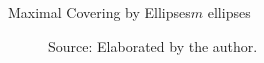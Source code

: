 \documentclass{beamer}
\newcommand{\source}[1]{\caption*{Source: {#1}} }
\begin{document}
\begin{frame}{Maximal Covering by Ellipses}{$m$ ellipses}
\begin{figure}
	
	\source{Elaborated by the author.}
\end{figure}
\end{frame}
\end{document}
